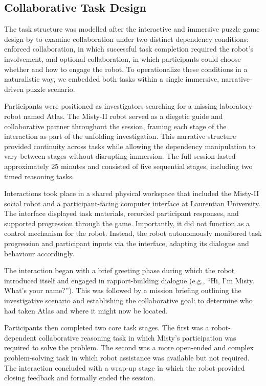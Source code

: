 \documentclass[
  authoryear,
  doubleblind,
  3p]{elsarticle}
\begin{document}
\subsection{Collaborative Task Design}\label{collaborative-task-design}

The task structure was modelled after the interactive and immersive
puzzle game design by \citet{lin2022} to examine collaboration under two
distinct dependency conditions: enforced collaboration, in which
successful task completion required the robot's involvement, and
optional collaboration, in which participants could choose whether and
how to engage the robot. To operationalize these conditions in a
naturalistic way, we embedded both tasks within a single immersive,
narrative-driven puzzle scenario.

Participants were positioned as investigators searching for a missing
laboratory robot named Atlas. The Misty-II robot served as a diegetic
guide and collaborative partner throughout the session, framing each
stage of the interaction as part of the unfolding investigation. This
narrative structure provided continuity across tasks while allowing the
dependency manipulation to vary between stages without disrupting
immersion. The full session lasted approximately 25 minutes and
consisted of five sequential stages, including two timed reasoning
tasks.

Interactions took place in a shared physical workspace that included the
Misty-II social robot and a participant-facing computer interface
\citep{mistyrobotics} at Laurentian University. The interface displayed
task materials, recorded participant responses, and supported
progression through the game. Importantly, it did not function as a
control mechanism for the robot. Instead, the robot autonomously
monitored task progression and participant inputs via the interface,
adapting its dialogue and behaviour accordingly.

The interaction began with a brief greeting phase during which the robot
introduced itself and engaged in rapport-building dialogue (e.g., ``Hi,
I'm Misty. What's your name?''). This was followed by a mission briefing
outlining the investigative scenario and establishing the collaborative
goal: to determine who had taken Atlas and where it might now be
located.

Participants then completed two core task stages. The first was a
robot-dependent collaborative reasoning task in which Misty's
participation was required to solve the problem. The second was a more
open-ended and complex problem-solving task in which robot assistance
was available but not required. The interaction concluded with a wrap-up
stage in which the robot provided closing feedback and formally ended
the session.
\end{document}
